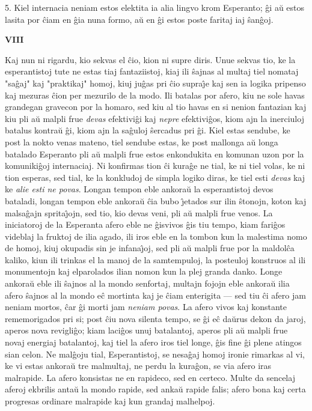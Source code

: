 5. Kiel internacia neniam estos elektita ia alia lingvo krom
Esperanto; \^gi a\u u estos lasita por \^ciam en \^gia nuna formo,
a\u u en \^gi estos poste faritaj iaj \^san\^goj.

\newpage

\begin{center}
\textbf{VIII}
\end{center}

   Kaj nun ni rigardu, kio sekvas el \^cio, kion ni supre diris. Unue
sekvas tio, ke la esperantistoj tute ne estas tiaj fantaziistoj,
kiaj ili \^sajnas al multaj tiel nomataj "sa\^gaj" kaj
"praktikaj" homoj, kiuj ju\^gas pri \^cio supra\^{\j}e kaj sen ia
logika pripenso kaj mezuras \^cion per mezurilo de la modo. Ili
batalas por afero, kiu ne sole havas grandegan gravecon por la
homaro, sed kiu al tio havas en si nenion fantazian kaj kiu pli a\u
u malpli frue {\sl devas} efektivi\^gi kaj {\sl nepre}
efektivi\^gos, kiom ajn la inerciuloj batalus kontra\u u \^gi, kiom
ajn la sa\^guloj \^sercadus pri \^gi. Kiel estas sendube, ke post la
nokto venas mateno, tiel sendube estas, ke post mallonga a\u u longa
batalado Esperanto pli a\u u malpli frue estos enkondukita en
komunan uzon por la komuniki\^goj internaciaj. Ni konfirmas tion
\^ci kura\^ge ne tial, ke ni tiel volas, ke ni tion esperas, sed
tial, ke la konkludoj de simpla logiko diras, ke tiel esti {\sl
devas} kaj ke {\sl alie esti ne povas}. Longan tempon eble ankora\u
u la esperantistoj devos bataladi, longan tempon eble ankora\u u
\^cia bubo \^{\j}etados sur ilin \^stonojn, koton kaj malsa\^gajn
sprita\^{\j}ojn, sed tio, kio devas veni, pli a\u u malpli frue
venos. La iniciatoroj de la Esperanta afero eble ne \^gisvivos \^gis
tiu tempo, kiam fari\^gos videblaj la fruktoj de ilia agado, ili
iros eble en la tombon kun la malestima nomo de homoj, kiuj okupadis
sin je infana\^{\j}oj, sed pli a\u u malpli frue por la maldol\^ca
kaliko, kiun ili trinkas el la manoj de la samtempuloj, la posteuloj
konstruos al ili monumentojn kaj elparolados ilian nomon kun la plej
granda danko. Longe ankora\u u eble ili \^sajnos al la mondo
senfortaj, multajn fojojn eble ankora\u u ilia afero \^sajnos al la
mondo e\^c mortinta kaj je \^ciam enterigita --- sed tiu \^ci afero
jam neniam mortos, \^car \^gi morti jam {\sl neniam povas}. La afero
vivos kaj konstante rememorigados pri si; post \^ciu nova silenta
tempo, se \^gi e\^c da\u urus dekon da jaroj, aperos nova
revigli\^go; kiam laci\^gos unuj batalantoj, aperos pli a\u u malpli
frue novaj energiaj batalantoj, kaj tiel la afero iros tiel longe,
\^gis fine \^gi plene atingos sian celon. Ne mal\^goju tial,
Esperantistoj, se nesa\^gaj homoj ironie rimarkas al vi, ke vi estas
ankora\u u tre malmultaj, ne perdu la kura\^gon, se via afero iras
malrapide. La afero konsistas ne en rapideco, sed en certeco. Multe
da sencelaj aferoj ekbrilis anta\u u la mondo rapide, sed anka\u u
rapide falis; afero bona kaj certa progresas ordinare malrapide kaj
kun grandaj malhelpoj.

